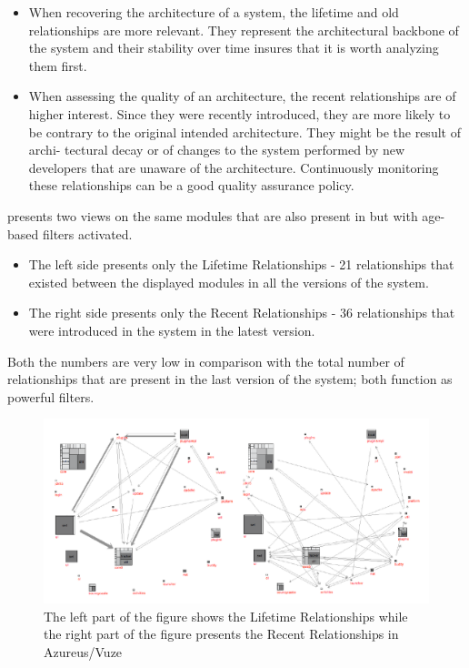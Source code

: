 \documentclass[preprint,12pt]{elsarticle}
\begin{document}
\begin{itemize}
\item When recovering the architecture of a system, the lifetime and old relationships are more relevant. They represent the architectural backbone of the system and their stability over time insures that it is worth analyzing them first.

\item When assessing the quality of an architecture, the recent relationships are of higher interest. Since they were recently introduced, they are more likely to be contrary to the original intended architecture. They might be the result of archi- tectural decay or of changes to the system performed by new developers that are unaware of the architecture. Continuously monitoring these relationships can be a good quality assurance policy.
\end{itemize}

 presents two views on the same modules that are also present in  but with age-based filters activated. 

\begin{itemize}
\item 
The left side presents only the Lifetime Relationships - 21 relationships that existed between the displayed modules in all the versions of the system. 
\item The right side presents only the Recent Relationships - 36 relationships that were introduced in the system in the latest version. 
\end{itemize}

Both the numbers are very low in comparison with the total number of relationships that are present in the last version of the system; both function as powerful filters.

\begin{figure}[h]
\begin{center}
\includegraphics[width=\linewidth]{images/Architecture-LifetimeVsRecent}
\caption{The left part of the figure shows the Lifetime Relationships while the right part of the figure presents the Recent Relationships in Azureus/Vuze}
\end{center}
\end{figure}
\end{document}

